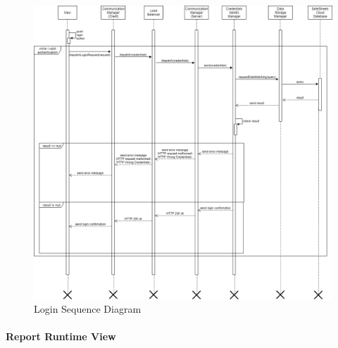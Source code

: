 \documentclass[titlepage]{article}
\begin{document}
\begin{figure}[h]
	\includegraphics[scale=0.42]{Diagrams/Sequence Diagrams/Runtime View Diagram login.png}
	\caption{Login Sequence Diagram}
\end{figure}
\FloatBarrier


\paragraph{Report Runtime View \\ \\}
\end{document}

